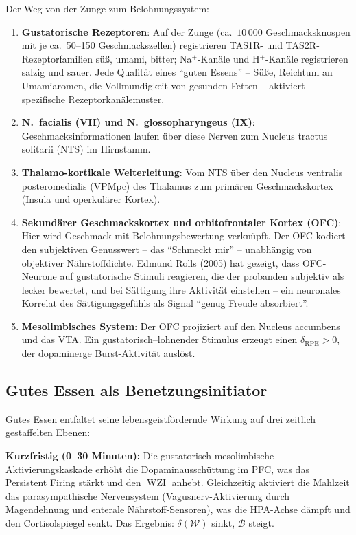 ﻿\documentclass[12pt,a4paper]{report}
\theoremstyle{plain}
\theoremstyle{definition}
\theoremstyle{remark}
\DeclareMathOperator{\WZI}{WZI}
\begin{document}
	Der Weg von der Zunge zum Belohnungssystem:
	\begin{enumerate}[label=\arabic*., leftmargin=1.8cm]
		\item \textbf{Gustatorische Rezeptoren}: Auf der Zunge (ca.\ $10\,000$
		Geschmacksknospen mit je ca.\ 50--150 Geschmackszellen) registrieren
		TAS1R- und TAS2R-Rezeptor\-familien süß, umami, bitter;
		Na$^+$-Kanäle und H$^+$-Kanäle registrieren salzig und sauer.
		Jede Qualität eines ``guten Essens'' -- Süße, Reichtum an
		Umamiar\-omen, die Vollmundigkeit von gesunden Fetten --
		aktiviert spezifische Rezeptorkanälemuster.
		\item \textbf{N.\ facialis (VII) und N.\ glossopharyngeus (IX)}:
		Geschmack\-sinformatio\-nen laufen über diese Nerven zum
		Nucleus tractus solitarii (NTS) im Hirnstamm.
		\item \textbf{Thalamo-kortikale Weiterleitung}: Vom NTS über den
		Nucleus ventralis posteromedialis (VPMpc) des Thalamus
		zum primären Geschmackskortex (Insula und operkulärer Kortex).
		\item \textbf{Sekundärer Geschmackskortex und orbitofrontaler Kortex (OFC)}:
		Hier wird Geschmack mit Belohnungsbewertung verknüpft.
		Der OFC kodiert den subjektiven Genusswert -- das ``Schmeckt mir'' --
		unabhängig von objektiver Nährstoffdichte.
		Edmund Rolls (2005) hat gezeigt, dass OFC-Neurone auf
		gustatorische Stimuli reagieren, die der probanden subjektiv
		als lecker bewertet, und bei Sättigung ihre Aktivität einstellen --
		ein neuronales Korrelat des Sättigungsgefühls als Signal
		``genug Freude absorbiert''.
		\item \textbf{Mesolimbisches System}: Der OFC projiziert auf den
		Nucleus accumbens und das VTA. Ein gustatorisch--lohnender Stimulus
		erzeugt einen $\delta_{\mathrm{RPE}} > 0$, der dopaminerge
		Burst-Aktivität auslöst.
	\end{enumerate}

	\subsection{Gutes Essen als Benetzungsinitiator}

	Gutes Essen entfaltet seine lebensgeistfördernde Wirkung
	auf drei zeitlich gestaffelten Ebenen:

	\textbf{Kurzfristig (0--30 Minuten):}
	Die gustatorisch-mesolimbische Aktivierungskaskade erhöht
	die Dopaminausschüttung im PFC, was das Persistent Firing stärkt
	und den $\WZI$ anhebt. Gleichzeitig aktiviert die Mahlzeit
	das parasympathische Nervensystem (Vagusnerv-Aktivierung durch
	Magendehnung und enterale Nährstoff-Sensoren), was die HPA-Achse
	dämpft und den Cortisolspiegel senkt. Das Ergebnis:
	$\delta(\mathcal{W})$ sinkt, $\mathcal{B}$ steigt.
\end{document}
